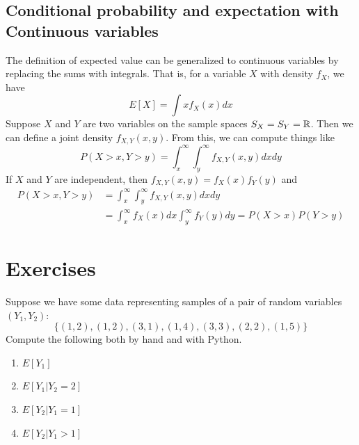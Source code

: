   

 \subsection{Conditional probability and expectation with Continuous variables}

The definition of expected value can be generalized to continuous variables by replacing the sums with integrals. That is, for a variable $X$ with density $f_X$, we have 
 \begin{equation*}
 E[X] = \int x f_X(x)dx 
 \end{equation*}
Suppose $X$ and $Y$ are two variables on the sample spaces $S_X = S_Y = \mathbb R$. Then we can define a joint density $f_{X,Y}(x,y)$. From this, we can compute things like 
 \begin{equation*}
P(X>x,Y>y) = \int_{x}^{\infty}\int_y^{\infty}f_{X,Y}(x,y)dxdy
 \end{equation*}
 If $X$ and $Y$ are independent, then $f_{X,Y}(x,y) = f_X(x)f_Y(y)$ and 
 \begin{align*}
P(X>x,Y>y) &= \int_{x}^{\infty}\int_y^{\infty}f_{X,Y}(x,y) dx dy\\
&=  \int_{x}^{\infty}f_X(x)dx\int_y^{\infty}f_Y(y)dy
 =P(X>x)P(Y>y)
 \end{align*}

  
  

\newpage

\section*{Exercises}

\begin{exercise}
Suppose we have some data representing samples of a pair of random variables $(Y_1,Y_2)$: 
\begin{equation*}
\{(1,2),(1,2),(3,1),(1,4),(3,3),(2,2),(1,5)\}
\end{equation*}
Compute the following both by hand and with Python. 
\begin{enumerate}[label=(\alph*)]
\item $E[Y_1]$
\item $E[Y_1|Y_2=2]$
\item $E[Y_2|Y_1=1]$
\item $E[Y_2|Y_1>1]$
\end{enumerate}
\end{exercise}

